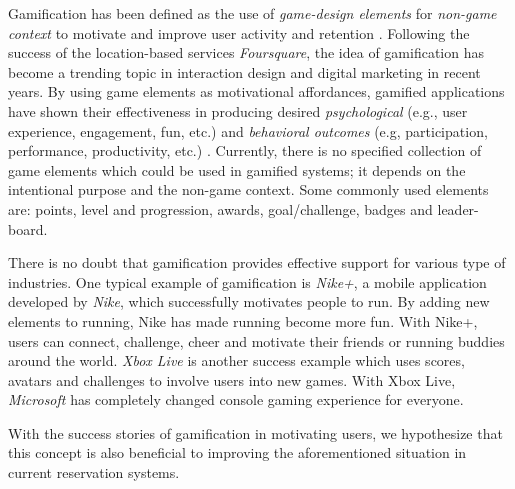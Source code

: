 Gamification has been defined as the use of \emph{game-design elements} for \emph{non-game context} to motivate and improve user activity and retention \cite{deterding2011game, hamari2014does}. Following the success of the location-based services \emph{Foursquare}, the idea of gamification has become a trending topic in interaction design and digital marketing \cite{deterding2011game} in recent years. By using game elements as motivational affordances, gamified applications have shown their effectiveness in producing desired \emph{psychological} (e.g., user experience, engagement, fun, etc.) and \emph{behavioral outcomes} (e.g, participation, performance, productivity, etc.) \cite{deterding2011game}. Currently, there is no specified collection of game elements which could be used in gamified systems; it depends on the intentional purpose and the non-game context. Some commonly used elements are: points, level and progression, awards, goal/challenge, badges and leader-board.

There is no doubt that gamification provides effective support for various type of industries. One typical example of gamification  is \emph{Nike+}, a mobile application developed by \emph{Nike}, which successfully motivates people to run. By adding new elements to running, Nike has made running become more fun. With Nike+, users can connect, challenge, cheer and motivate their friends or running buddies around the world. \emph{Xbox Live} is another success example which uses scores, avatars and challenges to involve users into new games. With Xbox Live, \emph{Microsoft} has completely changed console gaming experience for everyone.
 
With the success stories of gamification in motivating users, we hypothesize that this concept is also beneficial to improving the aforementioned situation in current reservation systems.